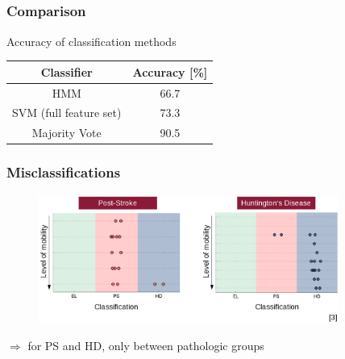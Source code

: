 \documentclass[aspectratio=43]{beamer} 	%
\begin{document}
\subsection*{}

\begin{frame}
\frametitle{Comparison}
\begin{block}
{Accuracy of classification methods}
\end{block}
	\begin{table}

		\centering
			\begin{tabular}{cc}
				\toprule
				Classifier & Accuracy [\%] \\
				\midrule
				HMM & 66.7 \\
				SVM (full feature set) & 73.3 \\
				Majority Vote & 90.5 \\
				\bottomrule
			\end{tabular}
	\end{table}
	\begin{block}
	{}
	\end{block}
\end{frame}





\begin{frame}
\frametitle{Misclassifications}
\begin{figure}[!t]
\centering
\includegraphics[height=4.2cm]{missclassification.png}
\end{figure}

\begin{block}
{$\Rightarrow$ for PS and HD, only between pathologic groups}
\end{block}
\end{frame}
\end{document}

